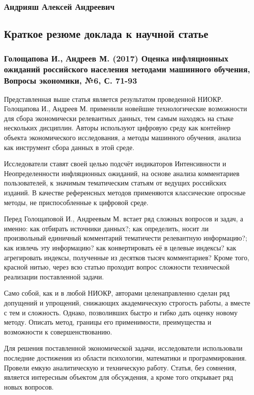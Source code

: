 \documentclass[a4paper, 12pt]{extarticle}
\numberwithin{figure}{section}
\begin{document}
\subsubsection*{Андрияш Алексей Андреевич}
\subsection*{Краткое резюме доклада к научной статье}
\subsubsection*{Голощапова И., Андреев М. (2017) Оценка инфляционных ожиданий российского населения методами машинного обучения, Вопросы экономики, №6, С. 71-93}

Представленная выше статья является результатом проведенной НИОКР. Голощапова И., Андреев М. применили новейшие технологические возможности для сбора экономически релевантных данных, тем самым находясь на стыке нескольких дисциплин. Авторы используют цифровую среду как контейнер объекта экономического исследования, а методы машинного обучения, анализа как инструмент сбора данных в этой среде.

Исследователи ставят своей целью подсчёт индикаторов Интенсивности и Неопределенности инфляционных ожиданий, на основе анализа комментариев пользователей, к значимым тематическим статьям от ведущих российских изданий. В качестве референсных методов применяются классические опросные методы, не приспособленные к цифровой среде.

Перед Голощаповой И., Андреевым М. встает ряд сложных вопросов и задач, а именно: как отбирать источники данных?; как определить, носит ли произвольный единичный комментарий тематичести релевантную информацию?; как извлечь эту информацию? как конвертировать её в целевые индексы? как агрегировать индексы, полученные из десятков тысяч комментариев? Кроме того, красной нитью, через всю статью проходит вопрос сложности технической реализации поставленной задачи. 

Само собой, как и в любой НИОКР, авторами целенаправленно сделан ряд допущений и упрощений, снижающих академическую строгость работы, а вместе с тем и сложность. Однако, позволивших быстро и гибко дать оценку новому методу. Описать метод, границы его применимости, преимущества и возможности к совершенствованию. 

Для решения поставленной экономической задачи, исследователи использовали последние достижения из области психологии, математики и программирования. Провели емкую аналитическую и техническую работу. Статья, без сомнения, является интересным объектом для обсуждения, а кроме того открывает ряд новых вопросов.
\end{document}

